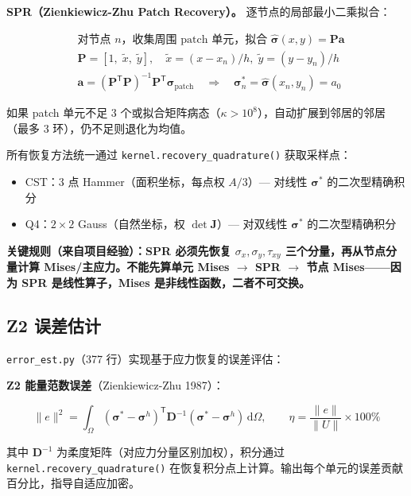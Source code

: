 \documentclass[12pt,a4paper]{ctexart}
\begin{document}
\textbf{SPR（Zienkiewicz-Zhu Patch Recovery）。} 逐节点的局部最小二乘拟合：

\begin{equation}\label{eq:spr}
\begin{aligned}
&\text{对节点 }n\text{，收集周围 patch 单元，拟合 }\hat{\bm{\sigma}}(x,y) = \mathbf{P}\mathbf{a} \\
&\mathbf{P} = [1,\; \tilde{x},\; \tilde{y}],\quad
\tilde{x} = (x - x_n)/h,\; \tilde{y} = (y - y_n)/h \\
&\mathbf{a} = (\mathbf{P}^{\mathsf T}\mathbf{P})^{-1}\mathbf{P}^{\mathsf T}\bm{\sigma}_{\text{patch}}
\quad\Rightarrow\quad \bm{\sigma}^*_n = \hat{\bm{\sigma}}(x_n,y_n) = a_0
\end{aligned}
\end{equation}

如果 patch 单元不足 3 个或拟合矩阵病态（$\kappa > 10^8$），自动扩展到邻居的邻居（最多 3 环），仍不足则退化为均值。

所有恢复方法统一通过 \texttt{kernel.recovery\_quadrature()} 获取采样点：
\begin{itemize}
  \item CST：3 点 Hammer（面积坐标，每点权 $A/3$）— 对线性 $\bm{\sigma}^*$ 的二次型精确积分
  \item Q4：$2\times2$ Gauss（自然坐标，权 $\det\mathbf{J}$）— 对双线性 $\bm{\sigma}^*$ 的二次型精确积分
\end{itemize}

\textbf{关键规则（来自项目经验）：SPR 必须先恢复 $\sigma_x,\sigma_y,\tau_{xy}$ 三个分量，再从节点分量计算 Mises/主应力。不能先算单元 Mises $\rightarrow$ SPR $\rightarrow$ 节点 Mises——因为 SPR 是线性算子，Mises 是非线性函数，二者不可交换。}

\subsection{Z2 误差估计}

\texttt{error\_est.py}（377 行）实现基于应力恢复的误差评估：

\textbf{Z2 能量范数误差}（Zienkiewicz-Zhu 1987）：

\begin{equation}\label{eq:z2}
\|e\|^2 = \int_\Omega (\bm{\sigma}^* - \bm{\sigma}^h)^{\mathsf T}\mathbf{D}^{-1}(\bm{\sigma}^* - \bm{\sigma}^h)\,\mathrm{d}\Omega,\qquad
\eta = \frac{\|e\|}{\|U\|}\times 100\%
\end{equation}

其中 $\mathbf{D}^{-1}$ 为柔度矩阵（对应力分量区别加权），积分通过 \texttt{kernel.recovery\_quadrature()} 在恢复积分点上计算。输出每个单元的误差贡献百分比，指导自适应加密。
\end{document}
